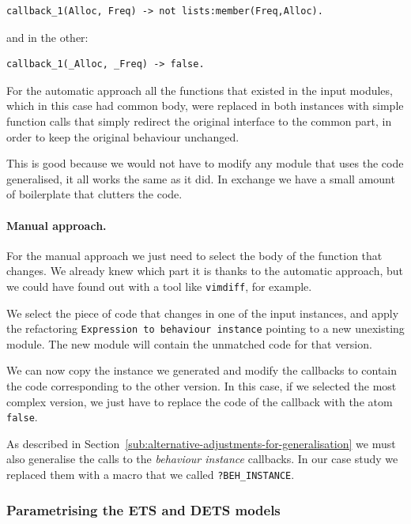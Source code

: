 \begin{verbatim}
callback_1(Alloc, Freq) -> not lists:member(Freq,Alloc).
\end{verbatim}

and in the other:

\begin{verbatim}
callback_1(_Alloc, _Freq) -> false.
\end{verbatim}


For the automatic approach all the functions that existed in the input modules, 
which in this case had common body, were replaced in both instances with simple 
function calls that simply redirect the original interface to the common part, 
in order to keep the original behaviour unchanged.

This is good because we would not have to modify any module that uses the code 
generalised, it all works the same as it did. In exchange we have a small 
amount of boilerplate that clutters the code.

\paragraph{Manual approach.}

For the manual approach we just need to select the body of the function that 
changes. We already knew which part it is thanks to the automatic approach, 
but we could have found out with a tool like \texttt{vimdiff}, for example.

We select the piece of code that changes in one of the input instances, and 
apply the refactoring \texttt{Expression to behaviour instance} pointing to a 
new unexisting module. The new module will contain the unmatched code for that 
version.

We can now copy the instance we generated and modify the callbacks to contain 
the code corresponding to the other version. In this case, if we selected the 
most complex version, we just have to replace the code of the callback with the 
atom \texttt{false}.

As described in Section~\ref{sub:alternative-adjustments-for-generalisation} we 
must also generalise the calls to the \emph{behaviour instance} callbacks. In 
our case study we replaced them with a macro that we called 
\texttt{?BEH\_INSTANCE}.

\subsubsection{Parametrising the ETS and DETS models}

